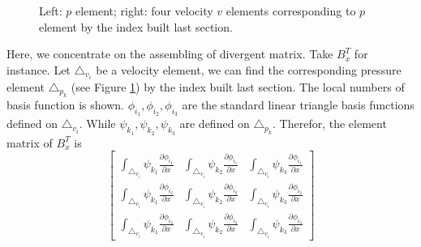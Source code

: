 \documentclass[a4paper, 11pt]{article}
\begin{document}
    \begin{figure}
      \centering    
      \caption{Left: $p$ element; 
               right: four velocity $v$ elements corresponding to
               $p$ element by the index built last section.}
      \label{fig::matrix_assemble}       
    \end{figure}
   
   Here, we concentrate on the assembling of divergent matrix. Take 
   $B_x^T$ for instance. Let $\triangle_{v_i}$ be a velocity element,
   we can find the corresponding pressure element $\triangle_{p_k}$ 
   (see Figure \ref{fig::matrix_assemble}) by the index built last
   section. The local numbers of basis function is shown. $\phi_{i_1},
   \phi_{i_2}, \phi_{i_3}$ are the standard linear triangle basis
   functions defined on $\triangle_{v_i}$. While
   $\psi_{k_1}, \psi_{k_2}, \psi_{k_3}$ are defined on
   $\triangle_{p_k}$. Therefor, the element matrix of $B_x^T$ is 
   \begin{equation}
     \left[
     \begin{array}{lll}
       \int_{\triangle_{v_i}}\psi_{k_1} \frac{\partial
         \phi_{i_1}}{\partial x} & \int_{\triangle_{v_i}} \psi_{k_2}
       \frac{\partial \phi_{i_1}}{\partial x} & \int_{\triangle_{v_i}}
       \psi_{k_3} \frac{\partial \phi_{i_1}}{\partial x} \\
       \int_{\triangle_{v_i}} \psi_{k_1} \frac{\partial
         \phi_{i_2}}{\partial x} & \int_{\triangle_{v_i}} \psi_{k_2}
       \frac{\partial \phi_{i_2}}{\partial x} & \int_{\triangle_{v_i}}
       \psi_{k_3} \frac{\partial \phi_{i_2}}{\partial x} \\
       \int_{\triangle_{v_i}} \psi_{k_1} \frac{\partial
         \phi_{i_3}}{\partial x} & \int_{\triangle_{v_i}} \psi_{k_2}
       \frac{\partial \phi_{i_3}}{\partial x} & \int_{\triangle_{v_i}}
       \psi_{k_3} \frac{\partial \phi_{i_3}}{\partial x}
     \end{array}
   \right]
   \label{eq::element_matrix}
   \end{equation}
   
\end{document}
